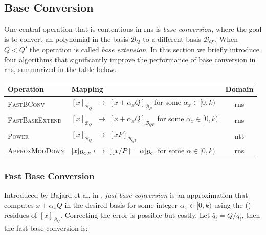 \subsection{Base Conversion}
\label{sec:rns-base-conversion}
One central operation that is contentious in \gls{rns} is \emph{base conversion}, where the goal is to convert an \secondForm{} polynomial in the basis $\mathcal{B}_Q$ to a different basis $\mathcal{B}_{Q'}$. 
When $Q < Q'$ the operation is called \emph{base extension}. %
In this section we briefly introduce four algorithms that significantly improve the performance of base conversion in \gls{rns}, summarized in the table below.

\begin{center}
    \begin{tabular}{@{}llc@{}}
    \toprule
    \textbf{Operation} & \textbf{Mapping} & \textbf{Domain} \\
    \midrule
    \textsc{FastBConv}      & $[x]_{\mathcal{B}_Q}\;\;\longmapsto\;[x + \alpha_xQ]_{\mathcal{B}_P}$ for some $\alpha_x \in [0, k)$ & \gls{rns} \\
    \textsc{FastBaseExtend} & $[x]_{\mathcal{B}_Q}\;\;\longmapsto\;[x + \alpha_xQ]_{\mathcal{B}_{QP}}$ for some $\alpha_x \in [0, k)$ & \gls{rns} \\
    \textsc{Power}          & $[x]_{\mathcal{B}_Q}\;\;\longmapsto\;[xP]_{\mathcal{B}_{QP}}$ & \gls{ntt} \\
    \textsc{ApproxModDown}  & $[x]_{\mathcal{B}_{QP}}\hspace{0.25pt}\longmapsto\;[\lfloor x/P \rceil - \alpha]_{\mathcal{B}_Q}$ for some $\alpha \in [0, k)$ & \gls{rns} \\
    \bottomrule
    \end{tabular}
\end{center}

\subsubsection{Fast Base Conversion}
Introduced by Bajard et al. in \cite[Equation 2]{cryptoeprint:2016/510}, \emph{fast base conversion} is an approximation that computes $x + \alpha_x Q$ in the desired basis %
for some integer $\alpha_x\in [0, k)$ using the (\firstForm{}) residues of $[x]_{\mathcal{B}_Q}$. Correcting the error is possible but costly. 
Let $\hat{q}_i = Q/q_i$, then the fast base conversion is:

